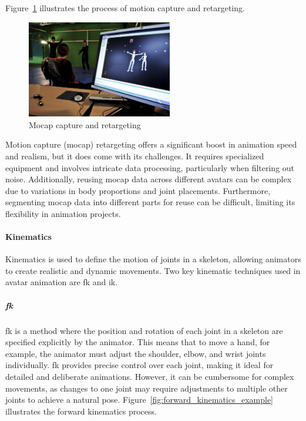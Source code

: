 \documentclass[../../main.tex]{subfiles}
\begin{document}
Figure~\ref{fig:mocap} illustrates the process of motion capture and retargeting.

\begin{figure} 
  \centering \includegraphics[width = 2.5in]{chapters/background_work/images/mocap.png} 
  \caption{Mocap capture and retargeting} 
  \label{fig:mocap} 
\end{figure}

Motion capture (mocap) retargeting offers a significant boost in animation speed and realism, but it does come with its challenges. It requires specialized equipment and involves intricate data processing, particularly when filtering out noise. Additionally, reusing mocap data across different avatars can be complex due to variations in body proportions and joint placements. Furthermore, segmenting mocap data into different parts for reuse can be difficult, limiting its flexibility in animation projects.

\paragraph{Kinematics}
\label{ch:background_work:sign_language_synthesis:3d_techniques:avatar_animation:kinematics}

Kinematics is used to define the motion of joints in a skeleton, allowing animators to create realistic and dynamic movements. Two key kinematic techniques used in avatar animation are \gls{fk} and \gls{ik}.

\subparagraph{\gls{fk}}
\label{ch:background_work:sign_language_synthesis:3d_techniques:avatar_animation:kinematics:forward_kinematics}

\gls{fk} is a method where the position and rotation of each joint in a skeleton are specified explicitly by the animator. This means that to move a hand, for example, the animator must adjust the shoulder, elbow, and wrist joints individually. \gls{fk} provides precise control over each joint, making it ideal for detailed and deliberate animations. However, it can be cumbersome for complex movements, as changes to one joint may require adjustments to multiple other joints to achieve a natural pose. Figure~\ref{fig:forward_kinematics_example} illustrates the forward kinematics process.
\end{document}

